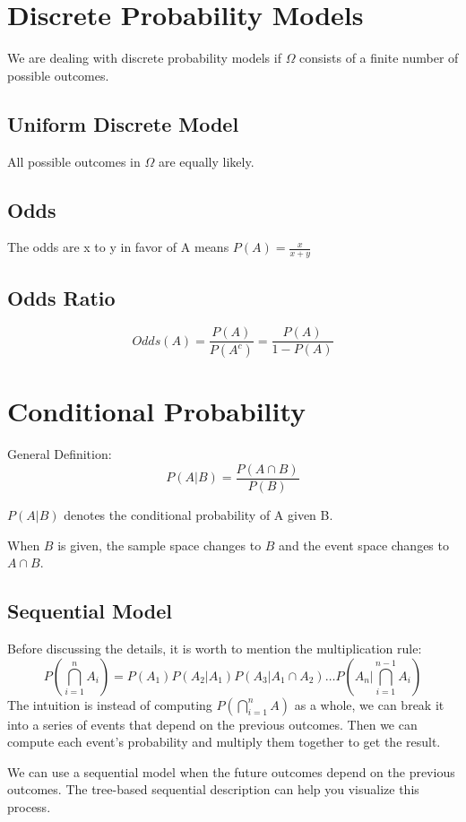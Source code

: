 \documentclass[11pt]{article}
\begin{document}
\section{Discrete Probability Models}
We are dealing with discrete probability models if $\Omega$ consists of a finite number of possible outcomes.

\subsection{Uniform Discrete Model}
All possible outcomes in $\Omega$ are equally likely.

\subsection{Odds}
The odds are x to y in favor of A means $P(A) = \frac{x}{x+y}$

\subsection{Odds Ratio}
$$Odds(A) = \frac{P(A)}{P(A^c)} = \frac{P(A)}{1 - P(A)}$$

\section{Conditional Probability} 
General Definition:
$$P(A | B) = \frac{P(A \cap B)}{P(B)}$$

$P(A | B)$ denotes the conditional probability of A given B.

When $B$ is given, the sample space changes to $B$ and the event space changes to $A \cap B$. 

\subsection{Sequential Model}
Before discussing the details, it is worth to mention the multiplication rule:
$$P(\bigcap_{i=1}^{n} A_i) = P(A_1)P(A_2 | A_1)P(A_3 | A_1 \cap A_2) \ldots P(A_n | \bigcap_{i=1}^{n-1} A_{i})$$
The intuition is instead of computing $P(\bigcap_{i=1}^{n} A)$ as a whole, we can break it into a series of events that depend on the previous outcomes. 
Then we can compute each event's probability and multiply them together to get the result.

We can use a sequential model when the future outcomes depend on the previous outcomes. 
The tree-based sequential description can help you visualize this process.
\end{document}
